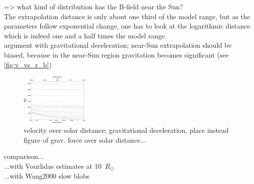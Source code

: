 => what kind of distribution has the B-field near the Sun?\\

The extrapolation distance is only about one third of the model range, but as the parameters follow exponential change, one has to look at the logarithmic distance which is indeed one and a half times the model range.\\

argument with gravitational deceleration; near-Sun extrapolation should be biased, because in the near-Sun region gravitation becomes significant (see \autoref{fig:v_vs_r_b})\\
\begin{figure}[htb]
	\centering
	\includegraphics[width=0.3\textwidth]{images/gnuplots/v_vs_r_b.png}
	\caption{velocity over solar distance; gravitational deceleration. place instead figure of grav. force over solar distance...}
	\label{fig:v_vs_r_b}
\end{figure}


comparison...\\
...with Vourlidas estimates at 10~$R_\odot$\\
...with Wang2000 slow blobs\\

